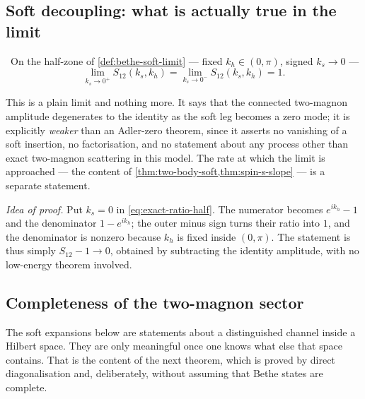 \subsection{Soft decoupling: what is actually true in the limit}

\begin{oracle}
\label{thm:soft-decoupling}
\statusProved\ On the half-zone of \cref{def:bethe-soft-limit} --- fixed
$k_h\in(0,\pi)$, signed $k_s\to0$ ---
\begin{equation}
  \lim_{k_s\to0^+}S_{12}(k_s,k_h)
  =\lim_{k_s\to0^-}S_{12}(k_s,k_h)=1 .
\end{equation}
\end{oracle}
\begin{scope}
This is a plain limit and nothing more. It says that the connected two-magnon
amplitude degenerates to the identity as the soft leg becomes a zero mode; it
is explicitly \emph{weaker} than an Adler-zero theorem, since it asserts no
vanishing of a soft insertion, no factorisation, and no statement about any
process other than exact two-magnon scattering in this model. The rate at
which the limit is approached --- the content of
\cref{thm:two-body-soft,thm:spin-s-slope} --- is a separate statement.
\end{scope}

\emph{Idea of proof.} Put $k_s=0$ in \cref{eq:exact-ratio-half}. The numerator
becomes $e^{ik_h}-1$ and the denominator $1-e^{ik_h}$; the outer minus sign
turns their ratio into $1$, and the denominator is nonzero because $k_h$ is
fixed inside $(0,\pi)$. The statement is thus simply $S_{12}-1\to0$, obtained
by subtracting the identity amplitude, with no low-energy theorem involved.

\subsection{Completeness of the two-magnon sector}

The soft expansions below are statements about a distinguished channel inside
a Hilbert space. They are only meaningful once one knows what else that space
contains. That is the content of the next theorem, which is proved by direct
diagonalisation and, deliberately, without assuming that Bethe states are
complete.

